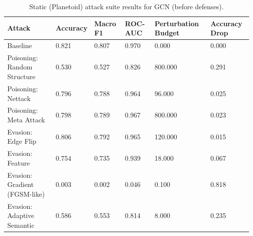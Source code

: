 \begin{table}[t]
\centering
\small
\begin{tabular}{llllll}
\toprule
Attack & Accuracy & Macro F1 & ROC-AUC & Perturbation Budget & Accuracy Drop \\
\midrule
Baseline & 0.821 & 0.807 & 0.970 & 0.000 & 0.000 \\
Poisoning: Random Structure & 0.530 & 0.527 & 0.826 & 800.000 & 0.291 \\
Poisoning: Nettack & 0.796 & 0.788 & 0.964 & 96.000 & 0.025 \\
Poisoning: Meta Attack & 0.798 & 0.789 & 0.967 & 800.000 & 0.023 \\
Evasion: Edge Flip & 0.806 & 0.792 & 0.965 & 120.000 & 0.015 \\
Evasion: Feature & 0.754 & 0.735 & 0.939 & 18.000 & 0.067 \\
Evasion: Gradient (FGSM-like) & 0.003 & 0.002 & 0.046 & 0.100 & 0.818 \\
Evasion: Adaptive Semantic & 0.586 & 0.553 & 0.814 & 8.000 & 0.235 \\
\bottomrule
\end{tabular}

\caption{Static (Planetoid) attack suite results for GCN (before defenses).}
\label{tab:static_gcn_attacks}
\end{table}

